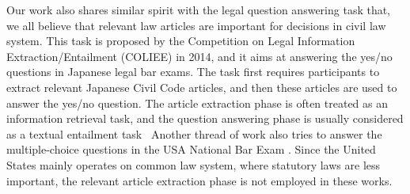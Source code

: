 Our work also shares similar spirit with the legal question answering task that, we all believe that relevant law articles are important for decisions in civil law system. This task is proposed by the Competition on Legal Information Extraction/Entailment (COLIEE) in 2014,
and it aims at answering the yes/no questions in Japanese legal bar exams. The task first requires participants to extract relevant Japanese Civil Code articles, and then these articles are used to answer the yes/no question. 
The article extraction phase is often treated as an information retrieval task, and the question answering phase is usually considered as a textual entailment task~\cite{kim2014legal,kimconvolutional}
Another thread of work also tries to answer the multiple-choice questions in the USA National Bar Exam \cite{FAWEI16,adebayoneural}. Since the United States mainly operates on common law system, where statutory laws are less important, the relevant article extraction phase is not employed in these works.